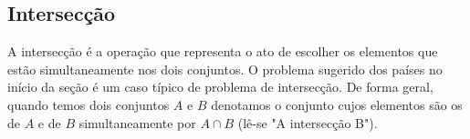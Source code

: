 \subsection{Intersecção}
A intersecção é a operação que representa o ato de escolher os elementos que estão simultaneamente nos dois conjuntos. O problema sugerido dos países no início da seção é um caso típico de problema de intersecção. De forma geral, quando temos dois conjuntos $A$ e $B$ denotamos o conjunto cujos elementos são os de $A$ e de $B$ simultaneamente por $A \cap B$ (lê-se "A intersecção B"). 


